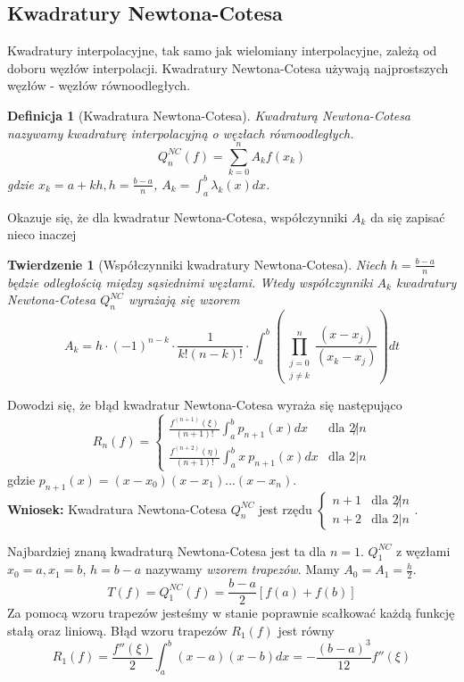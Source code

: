 \documentclass{article}
\newtheorem{defi}{Definicja}
\newtheorem{twr}{Twierdzenie}
\newcommand{\twopartdef}[4]
{
	\left\{
		\begin{array}{ll}
			#1 & \mbox{dla } #2 \\
			#3 & \mbox{dla } #4
		\end{array}
	\right.
}
\begin{document}
\subsection{Kwadratury Newtona-Cotesa}
Kwadratury interpolacyjne, tak samo jak wielomiany interpolacyjne, zależą od doboru węzłów interpolacji.
Kwadratury Newtona-Cotesa używają najprostszych węzłów - węzłów równoodległych.
\begin{defi}[Kwadratura Newtona-Cotesa]
	Kwadraturą Newtona-Cotesa nazywamy kwadraturę interpolacyjną o węzłach równoodległych.
	\begin{equation*}
		Q_n^{NC}(f) = \sum_{k = 0}^n A_k f(x_k)
	\end{equation*}
	gdzie $x_k = a + k h, h = \frac{b - a}{n}$, $A_k = \int_a^b \lambda_k(x) dx$.
\end{defi}
Okazuje się, że dla kwadratur Newtona-Cotesa, współczynniki $A_k$ da się zapisać nieco inaczej
\begin{twr}[Współczynniki kwadratury Newtona-Cotesa]
	Niech $h = \frac{b - a}{n}$ będzie odległością między sąsiednimi węzłami.
	Wtedy współczynniki $A_k$ kwadratury Newtona-Cotesa $Q_n^{NC}$ wyrażają się wzorem
	\begin{equation*}
		A_k = h \cdot (-1)^{n - k} \cdot \frac{1}{k! (n-k)!} \cdot \int_a^b \left ( \prod_{\substack{j = 0 \\ j \neq k}}^n \frac{(x - x_j)}{(x_k - x_j)}\right ) dt
	\end{equation*}
\end{twr}

Dowodzi się, że błąd kwadratur Newtona-Cotesa wyraża się następująco
\begin{equation*}
	R_n(f) = \twopartdef {\frac{f^{(n + 1)}(\xi)}{(n+1)!} \int_a^b p_{n + 1}(x) dx} {2\not| n} {\frac{f^{(n + 2)}(\eta)}{(n+1)!} \int_a^b x \ p_{n + 1}(x) dx} {2 | n}
\end{equation*}
gdzie $p_{n+1}(x) = (x - x_0) (x - x_1) ... (x - x_n)$. \\
\textbf{Wniosek: }Kwadratura Newtona-Cotesa $Q_n^{NC}$ jest rzędu $\twopartdef {n + 1} {2\not| n} {n + 2} {2 | n}$.

Najbardziej znaną kwadraturą Newtona-Cotesa jest ta dla $n = 1$. $Q_1^{NC}$ z węzłami $x_0 = a, x_1 = b$, $h = b - a$ nazywamy \emph{wzorem trapezów}.
Mamy $A_0 = A_1 = \frac{h}{2}$.
\begin{equation}
	T(f) = Q_1^{NC}(f) = \frac{b - a}{2} [f(a) + f(b)]
\end{equation}
Za pomocą wzoru trapezów jesteśmy w stanie poprawnie scałkować każdą funkcję stałą oraz liniową.
Błąd wzoru trapezów $R_1(f)$ jest równy
\begin{equation*}
	R_1(f) = \frac{f''(\xi)}{2} \int_a^b (x - a)(x - b) dx = - \frac{(b - a)^3}{12} f''(\xi)
\end{equation*}
\end{document}
